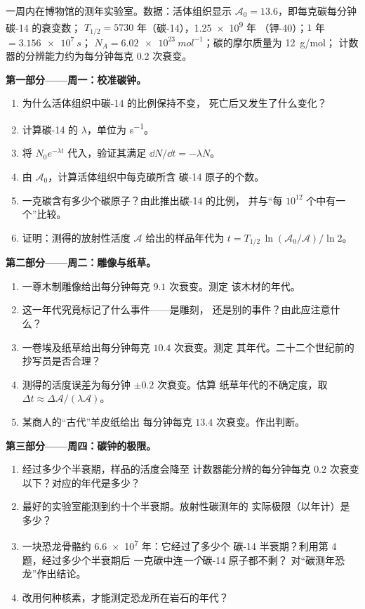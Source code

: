\begin{problem}
\label{pb:g12:radioactive-decay:1}
一周内在博物馆的测年实验室。数据：活体组织显示
$\mathcal A_0 = 13.6$，即每克碳每分钟碳-14 的衰变数；
$T_{1/2} = \num{5730}$ 年（碳-14），\num{1.25e9} 年
（钾-40）；$1$ 年 $= \qty{3.156e7}{s}$；
$N_A = \qty{6.02e23}{mol^{-1}}$；碳的摩尔质量为 \qty{12}{g/mol}；
计数器的分辨能力约为每分钟每克 $0.2$ 次衰变。

\medskip
\noindent\textbf{第一部分——周一：校准碳钟。}
\begin{enumerate}
  \item 为什么活体组织中碳-14 的比例保持不变，
        死亡后又发生了什么变化？
  \item 计算碳-14 的 $\lambda$，单位为 \unit{s^{-1}}。
  \item 将 $N_0 e^{-\lambda t}$ 代入，验证其满足
        $\dd N/\dd t = -\lambda N$。
  \item 由 $\mathcal A_0$，计算活体组织中每克碳所含
        碳-14 原子的个数。
  \item 一克碳含有多少个碳原子？由此推出碳-14 的比例，
        并与“每 $10^{12}$ 个中有一个”比较。
  \item 证明：测得的放射性活度 $\mathcal A$ 给出的样品年代为
        $t = T_{1/2}\,\ln(\mathcal A_0/\mathcal A)/\ln 2$。
\end{enumerate}

\medskip
\noindent\textbf{第二部分——周二：雕像与纸草。}
\begin{enumerate}[resume]
  \item 一尊木制雕像给出每分钟每克 $9.1$ 次衰变。测定
        该木材的年代。
  \item 这一年代究竟标记了什么事件——是雕刻，
        还是别的事件？由此应注意什么？
  \item 一卷埃及纸草给出每分钟每克 $10.4$ 次衰变。测定
        其年代。二十二个世纪前的抄写员是否合理？
  \item 测得的活度误差为每分钟 $\pm 0.2$ 次衰变。估算
        纸草年代的不确定度，取
        $\Delta t \approx \Delta\mathcal A/(\lambda \mathcal A)$。
  \item 某商人的“古代”羊皮纸给出
        每分钟每克 $13.4$ 次衰变。作出判断。
\end{enumerate}

\medskip
\noindent\textbf{第三部分——周四：碳钟的极限。}
\begin{enumerate}[resume]
  \item 经过多少个半衰期，样品的活度会降至
        计数器能分辨的每分钟每克 $0.2$ 次衰变以下？对应的年代是多少？
  \item 最好的实验室能测到约十个半衰期。放射性碳测年的
        实际极限（以年计）是多少？
  \item 一块恐龙骨骼约 \num{6.6e7} 年：它经过了多少个
        碳-14 半衰期？利用第 4 题，经过多少个半衰期后
        一克碳中连\emph{一个}碳-14 原子都不剩？
        对“碳测年恐龙”作出结论。
  \item 改用何种核素，才能测定恐龙所在岩石的年代？
\end{enumerate}


\end{problem}
